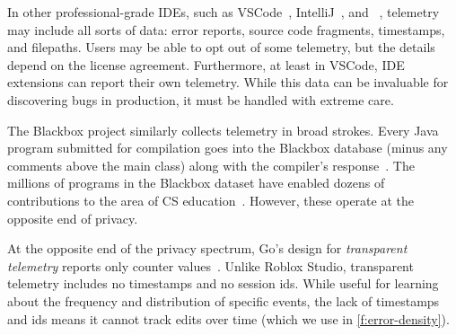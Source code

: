 \documentclass[english,submission,cleveref]{programming}
\begin{document}
In other professional-grade IDEs, such as VSCode~\cite{vscode-telemetry},
IntelliJ~\cite{intellij-telemetry}, and ~\cite{dotnet-telemetry}, telemetry may include all sorts of
data: error reports, source code fragments, time\-stamps, and filepaths.
Users may be able to opt out of some telemetry, but the details depend on the
license agreement.
Furthermore, at least in VSCode, IDE extensions can report their own telemetry.
While this data can be invaluable for discovering bugs in production, it
must be handled with extreme care.

The Blackbox project similarly collects telemetry in broad strokes.
Every Java program submitted for compilation goes into the Blackbox database (minus
any comments above the main class) along with the compiler's response~\cite{bkmu-sigcse-2014}.
The millions of programs in the Blackbox dataset
have enabled dozens of contributions to the area of CS
education~\cite{bask-icer-2018}. However, these operate at the
opposite end of privacy.


At the opposite end of the privacy spectrum, Go's design for \emph{transparent
telemetry} reports only counter values~\cite{transparent-telemetry}.
Unlike Roblox Studio, transparent telemetry includes no timestamps and no 
session ids.
While useful for learning about the frequency and distribution of
specific events, the lack of timestamps and ids means it cannot track
edits over time (which we use in \cref{f:error-density}).
\end{document}
